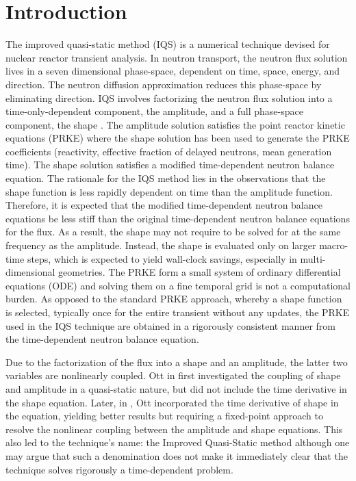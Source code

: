 \documentclass{elsarticle}
\begin{document}
\section{Introduction}

The improved quasi-static method (IQS) is a numerical technique devised for nuclear reactor transient analysis. In neutron transport, the neutron flux solution lives in a seven dimensional phase-space, dependent on time, space, energy, and direction. The neutron diffusion approximation reduces this phase-space by eliminating direction. IQS involves factorizing the neutron flux solution into a time-only-dependent component, the amplitude, and a full phase-space component, the shape \cite{Ott_1966,Devooght_1984,Monier_diss,Sissaoui_1995,Dulla2008}. The amplitude solution satisfies the point reactor kinetic equations (PRKE) where the shape solution has been used to generate the PRKE coefficients (reactivity, effective fraction of delayed neutrons, mean generation time). The shape solution satisfies a modified time-dependent neutron balance equation. The rationale for the IQS method lies in the observations that the shape function is less rapidly dependent on time than the amplitude function. Therefore, it is expected that the modified time-dependent neutron balance equations be less stiff than the original time-dependent neutron balance equations for the flux. As a result, the shape may not require to be solved for at the same frequency as the amplitude. Instead, the shape is evaluated only on larger macro-time steps, which is expected to yield wall-clock savings, especially in multi-dimensional geometries. The PRKE form a small system of ordinary differential equations (ODE) and solving them on a fine temporal grid is not a computational burden. As opposed to the standard PRKE approach, whereby a shape function is selected, typically once for the entire transient without any updates, the PRKE used in the IQS technique are obtained in a rigorously consistent manner from the time-dependent neutron balance equation.

Due to the factorization of the flux into a shape and an amplitude, the latter two variables are nonlinearly coupled. Ott in \cite{Ott_1966} first investigated the coupling of shape and amplitude in a quasi-static nature, but did not include the time derivative in the shape equation. Later, in \cite{Ott_1969}, Ott incorporated the time derivative of shape in the equation, yielding better results but requiring a fixed-point approach to resolve the nonlinear coupling between the amplitude and shape equations. This also led to the technique's name: the Improved Quasi-Static method although one may argue that such a denomination does not make it immediately clear that the technique solves rigorously a time-dependent problem. 
\end{document}
